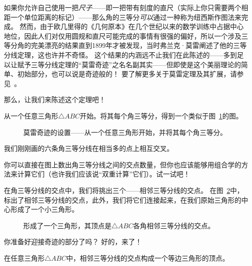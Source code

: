 如果你允许自己使用一把\emph{尺子}——即一把带有刻度的直尺（实际上你只需要两个相距一个单位距离的标记）——那么角的三等分\emph{可以}通过一种称为纽西斯作图法来完成。
然而，由于欧几里得的《几何原本》在几个世纪以来的数学训练中占据中心地位，因此人们对仅用圆规和直尺可能完成的事情有很强的偏好，所以一个涉及三等分角的完美漂亮的结果直到1899年才被发现，当时弗兰克·莫雷阐述了他的三等分线定理，这也许并不奇怪。
这个结果的内涵远不止我们在此陈述的——多到足以让赋予三等分线定理的“莫雷奇迹”之名名副其实——但即使是这个美丽理论的简单、初始部分，也可以说是奇迹般的！
要了解更多关于莫雷定理及其扩展，请参见~\cite{lighthouse}。

那么，让我们来陈述这个定理吧！

从一个任意三角形${\triangle}ABC$开始。将其每个角三等分，得到一个类似于图~\ref{fig:morley_setup}的图。

\begin{figure}[!hbtp] 
\begin{center}

\end{center}
\caption[莫雷奇迹的设置。]{莫雷奇迹的设置——从一个任意三角形开始，并将其每个角三等分。}
\label{fig:morley_setup}
\end{figure}

我们刚刚画的六条角三等分线在相当多的点上相互交叉。

\begin{exer}
你可以直接在图上数出角三等分线之间的交点数量，但你也应该能够用组合学的方法来计算它们（也许我们应该说“双重计算”它们）。试一试吧！
\end{exer}

在角三等分线的交点中，我们将挑出三个——相邻三等分线的交点。
在图~\ref{fig:morley_1st_triangle}中，标出了相邻三等分线的交点，此外，我们将它们连接起来，在我们原始三角形的中心形成了一个小三角形。

\clearpage

\begin{figure}[!hbtp] 
\begin{center}

\end{center}
\caption[第一个莫雷三角形。]{形成了一个三角形，其顶点是${\triangle}ABC$各角相邻三等分线的交点。}
\label{fig:morley_1st_triangle}
\end{figure}

你准备好迎接奇迹的部分了吗？
好的，来了！

\begin{thm}
在任意三角形${\triangle}ABC$中，相邻三等分线的交点构成一个等边三角形的顶点。
\end{thm}

